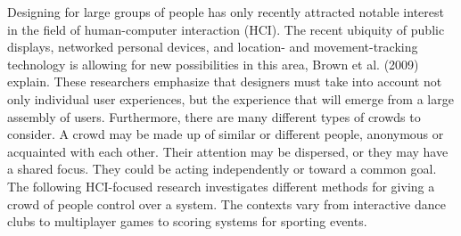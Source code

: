 Designing for large groups of people has only recently attracted notable interest in the field of human-computer interaction (HCI). The recent ubiquity of public displays, networked personal devices, and location- and movement-tracking technology is allowing for new possibilities in this area, Brown et al. (2009) explain. These researchers emphasize that designers must take into account not only individual user experiences, but the experience that will emerge from a large assembly of users. Furthermore, there are many different types of crowds to consider. A crowd may be made up of similar or different people, anonymous or acquainted with each other. Their attention may be dispersed, or they may have a shared focus. They could be acting independently or toward a common goal. The following HCI-focused research investigates different methods for giving a crowd of people control over a system. The contexts vary from interactive dance clubs to multiplayer games to scoring systems for sporting events.

